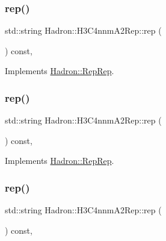 \subsubsection{\texorpdfstring{rep()}{rep()}\hspace{0.1cm}{\footnotesize\ttfamily [1/3]}}
{\footnotesize\ttfamily std\+::string Hadron\+::\+H3\+C4nnm\+A2\+Rep\+::rep (\begin{DoxyParamCaption}{ }\end{DoxyParamCaption}) const\hspace{0.3cm}{\ttfamily [inline]}, {\ttfamily [virtual]}}



Implements \mbox{\hyperlink{structHadron_1_1RepRep_ab3213025f6de249f7095892109575fde}{Hadron\+::\+Rep\+Rep}}.

\mbox{\label{structHadron_1_1H3C4nnmA2Rep_a2e3cc9bd16d8097b2b57f500b0d82be1}} 
\subsubsection{\texorpdfstring{rep()}{rep()}\hspace{0.1cm}{\footnotesize\ttfamily [2/3]}}
{\footnotesize\ttfamily std\+::string Hadron\+::\+H3\+C4nnm\+A2\+Rep\+::rep (\begin{DoxyParamCaption}{ }\end{DoxyParamCaption}) const\hspace{0.3cm}{\ttfamily [inline]}, {\ttfamily [virtual]}}



Implements \mbox{\hyperlink{structHadron_1_1RepRep_ab3213025f6de249f7095892109575fde}{Hadron\+::\+Rep\+Rep}}.

\mbox{\label{structHadron_1_1H3C4nnmA2Rep_a2e3cc9bd16d8097b2b57f500b0d82be1}} 
\subsubsection{\texorpdfstring{rep()}{rep()}\hspace{0.1cm}{\footnotesize\ttfamily [3/3]}}
{\footnotesize\ttfamily std\+::string Hadron\+::\+H3\+C4nnm\+A2\+Rep\+::rep (\begin{DoxyParamCaption}{ }\end{DoxyParamCaption}) const\hspace{0.3cm}{\ttfamily [inline]}, {\ttfamily [virtual]}}



